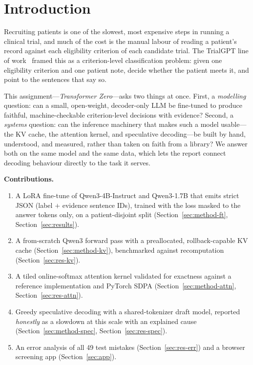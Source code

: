 \documentclass[conference]{IEEEtran}
\begin{document}
\section{Introduction}
Recruiting patients is one of the slowest, most expensive steps in running a
clinical trial, and much of the cost is the manual labour of reading a patient's
record against each eligibility criterion of each candidate trial. The TrialGPT
line of work~\cite{jin2024trialgpt} framed this as a criterion-level
classification problem: given one eligibility criterion and one patient note,
decide whether the patient meets it, and point to the sentences that say so.

This assignment---\emph{Transformer Zero}---asks two things at once. First, a
\emph{modelling} question: can a small, open-weight, decoder-only LLM be
fine-tuned to produce faithful, machine-checkable criterion-level decisions with
evidence? Second, a \emph{systems} question: can the inference machinery that
makes such a model usable---the KV cache, the attention kernel, and speculative
decoding---be built by hand, understood, and measured, rather than taken on
faith from a library? We answer both on the same model and the same data, which
lets the report connect decoding behaviour directly to the task it serves.

\textbf{Contributions.}
\begin{enumerate}
\item A LoRA fine-tune of Qwen3-4B-Instruct and Qwen3-1.7B that emits strict JSON
(label $+$ evidence sentence IDs), trained with the loss masked to the answer
tokens only, on a patient-disjoint split (Section~\ref{sec:method-ft},
Section~\ref{sec:results}).
\item A from-scratch Qwen3 forward pass with a preallocated, rollback-capable KV
cache (Section~\ref{sec:method-kv}), benchmarked against recomputation
(Section~\ref{sec:res-kv}).
\item A tiled online-softmax attention kernel validated for exactness against a
reference implementation and PyTorch SDPA (Section~\ref{sec:method-attn},
Section~\ref{sec:res-attn}).
\item Greedy speculative decoding with a shared-tokenizer draft model, reported
\emph{honestly} as a slowdown at this scale with an explained cause
(Section~\ref{sec:method-spec}, Section~\ref{sec:res-spec}).
\item An error analysis of all 49 test mistakes (Section~\ref{sec:res-err}) and a
browser screening app (Section~\ref{sec:app}).
\end{enumerate}
\end{document}
